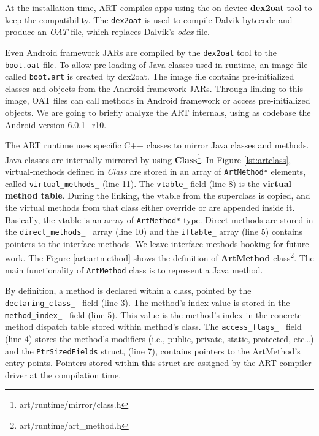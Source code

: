 At the installation time, ART compiles apps using the on-device \textbf{dex2oat} tool to keep the compatibility. The {\tt dex2oat} is used to compile Dalvik bytecode and produce an \textit{OAT} file, which replaces Dalvik's \textit{odex} file. 

Even Android framework JARs are compiled by the {\tt dex2oat} tool to the {\tt boot.oat} file. To allow pre-loading of Java classes used in runtime, an image file called {\tt boot.art} is created by dex2oat. The image file contains pre-initialized classes and objects from the Android framework JARs. Through linking to this image, OAT files can call methods in Android framework or access pre-initialized objects. We are going to briefly analyze the ART internals, using as codebase the Android version 6.0.1\_r10.

%

The ART runtime uses specific C++ classes to mirror Java classes and methods. Java classes are internally mirrored by using \textbf{Class}\footnote{art/runtime/mirror/class.h}. In Figure \ref{lst:artclass}, virtual-methods defined in \textit{Class} are stored in an array of {\tt ArtMethod*} elements, called {\tt virtual\_methods\_} (line 11). The {\tt vtable\_} field (line 8) is the \textbf{virtual method table}. During the linking, the vtable from the superclass is copied, and the virtual methods from that class either override or are appended inside it. Basically, the vtable is an array of {\tt ArtMethod*} type. Direct methods are stored in the {\tt direct\_methods\_ } array (line 10) and the  {\tt iftable\_} array (line 5) contains pointers to the interface methods. We leave interface-methods hooking for future work. The Figure \ref{art:artmethod} shows the definition of \textbf{ArtMethod} class\footnote{art/runtime/art\_method.h}. The main functionality of {\tt ArtMethod} class is to represent a Java method.


%

By definition, a method is declared within a class, pointed by the {\tt declaring\_class\_ } field (line 3). The method's index value is stored in the {\tt method\_index\_ } field (line 5). This value is the method's index in the concrete method dispatch table stored within method's class. The {\tt access\_flags\_ } field (line 4) stores the method's modifiers (i.e., public, private, static, protected, etc\ldots) and the {\tt PtrSizedFields} struct, (line 7), contains pointers to the ArtMethod's entry points. Pointers stored within this struct are assigned by the ART compiler driver at the compilation time. 


